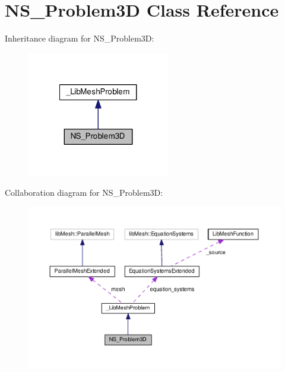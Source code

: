 \hypertarget{class_n_s___problem3_d}{\section{N\-S\-\_\-\-Problem3\-D Class Reference}
\label{class_n_s___problem3_d}
}


Inheritance diagram for N\-S\-\_\-\-Problem3\-D\-:\nopagebreak
\begin{figure}[H]
\begin{center}
\leavevmode
\includegraphics[width=176pt]{class_n_s___problem3_d__inherit__graph}
\end{center}
\end{figure}


Collaboration diagram for N\-S\-\_\-\-Problem3\-D\-:\nopagebreak
\begin{figure}[H]
\begin{center}
\leavevmode
\includegraphics[width=350pt]{class_n_s___problem3_d__coll__graph}
\end{center}
\end{figure}
